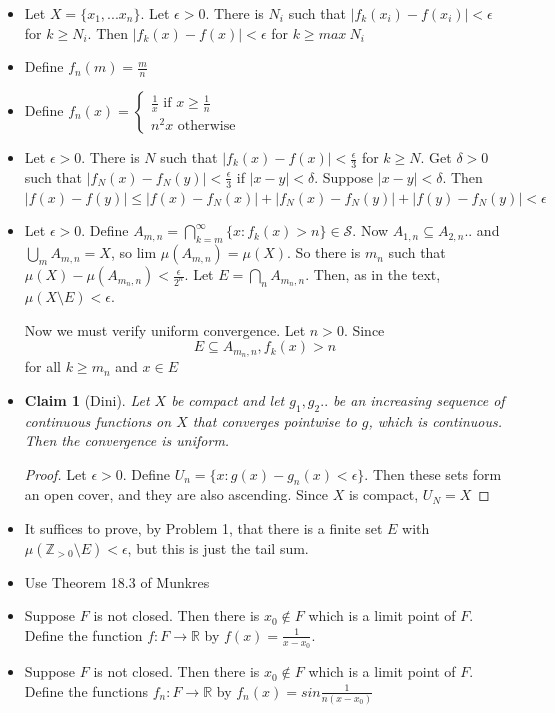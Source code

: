 \documentclass{article}
\newtheorem*{claim}{Claim}
\begin{document}
\begin{itemize}
    \item [1] Let $X= \{x_1,...x_n\}$. Let $\epsilon > 0$. There is $N_i$ such that $|f_k(x_i)-f(x_i)|<\epsilon$ for $k \geq N_i$. Then $|f_k(x)-f(x)|<\epsilon$ for $k \geq max \ N_i$
    \item [2] Define $f_n(m)=\frac{m}{n}$
    \item [3] Define $f_n(x)=\begin{cases}
        \frac{1}{x} \text{ if } x \geq\frac{1}{n} \\
        n^2x \text{ otherwise }
    \end{cases}$
    \item [4] Let $\epsilon > 0$. There is $N$ such that $|f_k(x)-f(x)|< \frac{\epsilon}{3}$ for $k \geq N$. Get $\delta > 0$ such that $|f_N(x)-f_N(y)|<\frac{\epsilon}{3}$ if $|x-y|<\delta$. Suppose $|x-y|<\delta$. Then $|f(x)-f(y)| \leq |f(x) -f_N(x)|+|f_N(x)-f_N(y)|+|f(y)-f_N(y)|<\epsilon$

    \item[6] Let $\epsilon > 0$. Define $A_{m,n}=\bigcap_{k=m}^\infty \{x:f_k(x)>n\}\in \mathcal{S}$. Now $A_{1,n}\subseteq A_{2,n}..$ and $\bigcup_m A_{m,n}=X$, so lim $\mu(A_{m,n})=\mu(X)$. So there is $m_n$ such that $\mu(X)-\mu(A_{m_n,n})<\frac{\epsilon}{2^n}$. Let $E =\bigcap_nA_{m_n,n}$. Then, as in the text, $\mu(X \setminus E)<\epsilon$. 

    Now we must verify uniform convergence. Let $n>0$. Since \[E \subseteq A_{m_n,n},f_k(x)>n\] for all $k\geq m_n$ and $x \in E$

    \item [7]\begin{claim}[Dini]
        Let $X$ be compact and let $g_1,g_2..$ be an increasing sequence of continuous functions on $X$ that converges pointwise to $g$, which is continuous. Then the convergence is uniform.
    \end{claim}

    \begin{proof}
        Let $\epsilon > 0$. Define $U_n=\{x:g(x)-g_n(x)<\epsilon\}$. Then these sets form an open cover, and they are also ascending. Since $X$ is compact, $U_N=X$
    \end{proof}

    \item[8] It suffices to prove, by Problem 1, that there is a finite set $E$ with $\mu(\mathbb{Z}_{>0}\setminus E)<\epsilon$, but this is just the tail sum.

    \item[9] Use Theorem 18.3 of Munkres

    \item[10] Suppose $F$ is not closed. Then there is $x_0 \notin F$ which is a limit point of $F$. Define the function $f:F \to \mathbb{R}$ by $f(x)=\frac{1}{x-x_0}$. 

    \item[11] Suppose $F$ is not closed. Then there is $x_0 \notin F$ which is a limit point of $F$. Define the functions $f_n:F \to \mathbb{R}$ by $f_n(x)=sin\frac{1}{n(x-x_0)}$ %

    
\end{itemize}
\end{document}
